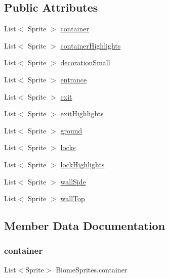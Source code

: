 \subsection*{Public Attributes}
\begin{DoxyCompactItemize}
\item 
List$<$ Sprite $>$ \mbox{\hyperlink{class_biome_sprites_a8fb08a6b474e7f7e8a40daf20a463de4}{container}}
\item 
List$<$ Sprite $>$ \mbox{\hyperlink{class_biome_sprites_a33ba33f3c0d2dac517d0e883d4763e13}{container\+Highlights}}
\item 
List$<$ Sprite $>$ \mbox{\hyperlink{class_biome_sprites_af23ad2a951ba13ed24370a3fe003bfa0}{decoration\+Small}}
\item 
List$<$ Sprite $>$ \mbox{\hyperlink{class_biome_sprites_a28d07a7a7f5e0d8218f82adec2420b94}{entrance}}
\item 
List$<$ Sprite $>$ \mbox{\hyperlink{class_biome_sprites_ae504f59a35b8bb0f6147a2ca926f1c25}{exit}}
\item 
List$<$ Sprite $>$ \mbox{\hyperlink{class_biome_sprites_a6bd7dcfd227829a0d67359dd4e67d666}{exit\+Highlights}}
\item 
List$<$ Sprite $>$ \mbox{\hyperlink{class_biome_sprites_ad2325cb250ec73430e73738fb4da15f9}{ground}}
\item 
List$<$ Sprite $>$ \mbox{\hyperlink{class_biome_sprites_a9965a03afe286f1989281b3ccc3c6d51}{locks}}
\item 
List$<$ Sprite $>$ \mbox{\hyperlink{class_biome_sprites_a9afc6cf26fcf8ef18ee0ad3bfa95c000}{lock\+Highlights}}
\item 
List$<$ Sprite $>$ \mbox{\hyperlink{class_biome_sprites_ae50f2ead3749017429753f14a0acf8ff}{wall\+Side}}
\item 
List$<$ Sprite $>$ \mbox{\hyperlink{class_biome_sprites_a4653b5307c630bec66c3b4c14f8d54f0}{wall\+Top}}
\end{DoxyCompactItemize}


\subsection{Member Data Documentation}
\mbox{\label{class_biome_sprites_a8fb08a6b474e7f7e8a40daf20a463de4}} 
\subsubsection{\texorpdfstring{container}{container}}
{\footnotesize\ttfamily List$<$Sprite$>$ Biome\+Sprites.\+container}

